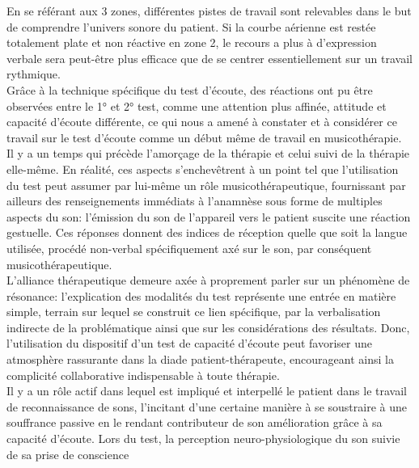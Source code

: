 \begin{itemize}
 En se référant aux
 3 zones,  différentes pistes de travail sont relevables dans le but de
 comprendre l'univers sonore du patient. 
 Si la courbe aérienne est restée
 totalement plate et non
 réactive en zone 2, le recours a  plus à d'expression verbale sera peut-être plus efficace que de se 
 centrer essentiellement sur un travail rythmique.  
   \\
 Grâce à la technique spécifique du test d'écoute, des réactions ont pu être observées entre le 1° et 2° 
 test, comme une attention plus affinée, attitude et capacité d'écoute différente, ce qui nous 
 a amené à constater et à considérer ce travail sur le test d'écoute comme un début même de  travail en 
 musicothérapie. 
  \\
  Il y a un temps qui
  précède
  l'amorçage de la thérapie et celui suivi de la thérapie elle-même.
  En réalité, ces aspects s'enchevêtrent à un point tel que
  l'utilisation du test peut assumer par lui-même un rôle musicothérapeutique, fournissant par ailleurs des
  renseignements immédiats à l'anamnèse sous forme de multiples
  aspects du son: l'émission du son de
  l'appareil vers le patient suscite une  réaction gestuelle.  Ces réponses  
  donnent des indices de réception %
  quelle que soit la langue utilisée, procédé non-verbal
  spécifiquement axé sur le son, par conséquent  musicothérapeutique. 
  	 \\
  	L'alliance thérapeutique demeure axée à proprement parler sur
  	un phénomène de résonance:  l'explication des modalités du test représente une
  	entrée en matière simple, terrain  sur lequel se construit ce lien spécifique,
  	par la verbalisation indirecte de la problématique ainsi que sur
  	les considérations des résultats.
  	Donc, l'utilisation
  	du dispositif d'un test de capacité d'écoute peut favoriser une atmosphère rassurante dans la diade
  	patient-thérapeute, encourageant ainsi la complicité collaborative
  	indispensable à toute
  	thérapie.
  	 \\	
  		 Il y a  un rôle actif dans lequel est impliqué et interpellé le patient dans le travail
  	de reconnaissance de sons, l'incitant d'une certaine manière  à se soustraire à une souffrance
  	passive en  le rendant  contributeur de son amélioration grâce à sa capacité
  	d'écoute.
  	Lors du test, la perception
  	neuro-physiologique du son suivie de sa prise de conscience

\end{itemize}
